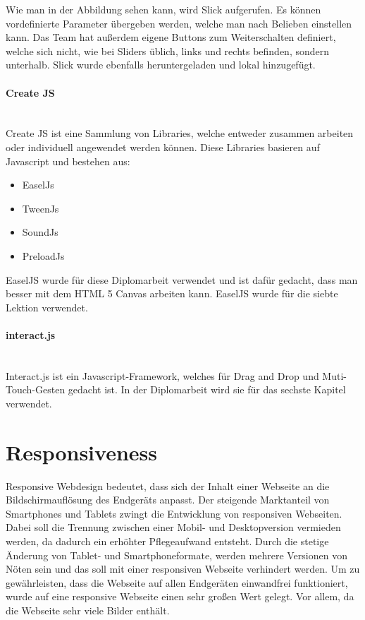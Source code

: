 Wie man in der Abbildung sehen kann, wird Slick aufgerufen. Es können vordefinierte Parameter übergeben werden, welche man nach Belieben einstellen kann. Das Team hat außerdem eigene Buttons zum Weiterschalten definiert, welche sich nicht, wie bei Sliders üblich, links und rechts befinden, sondern unterhalb. Slick wurde ebenfalls heruntergeladen und lokal hinzugefügt.

\paragraph{Create JS} 
\leavevmode \\
Create JS ist eine Sammlung von Libraries, welche entweder zusammen arbeiten oder individuell angewendet werden können. Diese Libraries basieren auf Javascript und bestehen aus:
\begin{itemize}
\item EaselJs
\item TweenJs
\item SoundJs
\item PreloadJs
\end{itemize}

EaselJS wurde für diese Diplomarbeit verwendet und ist dafür gedacht, dass man besser mit dem HTML 5 Canvas arbeiten kann. EaselJS wurde für die siebte Lektion verwendet. 

\paragraph{interact.js}
\leavevmode \\ 
Interact.js ist ein Javascript-Framework, welches für Drag and Drop und Muti-Touch-Gesten gedacht ist. In der Diplomarbeit wird sie für das sechste Kapitel verwendet. 


\section{Responsiveness}
Responsive Webdesign bedeutet, dass sich der Inhalt einer Webseite an die Bildschirmauflösung des Endgeräts anpasst. Der steigende Marktanteil von Smartphones und Tablets zwingt die Entwicklung von responsiven Webseiten. Dabei soll die Trennung zwischen einer Mobil- und Desktopversion vermieden werden, da dadurch ein erhöhter Pflegeaufwand entsteht. Durch die stetige Änderung von Tablet- und Smartphoneformate, werden mehrere Versionen von Nöten sein und das soll mit einer responsiven Webseite verhindert werden. 
Um zu gewährleisten, dass die Webseite auf allen Endgeräten einwandfrei funktioniert, wurde auf eine responsive Webseite einen sehr großen Wert gelegt. Vor allem, da die Webseite sehr viele Bilder enthält.


